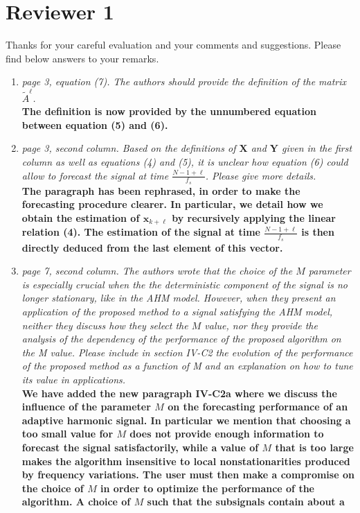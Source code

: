 \documentclass[11pt,DIV=16]{scrartcl}
\begin{document}
\section*{Reviewer 1}
Thanks for your careful evaluation and your comments and suggestions. Please find below answers to your remarks.
\begin{enumerate}[1)]
\item
\textit{page 3, equation (7). The authors should provide the definition of the matrix $\tilde{A}^\ell$.}\\
\textbf{The definition is now provided by the unnumbered equation between equation (5) and (6).}
\item
\textit{page 3, second column. Based on the definitions of $\mathbf{X}$ and $\mathbf{Y}$ given in the first column as well as equations (4) and (5), it is unclear how equation (6) could allow to forecast the signal at time $\frac{N-1+\ell}{f_s}$. Please give more details.}\\
\textbf{The paragraph has been rephrased, in order to make the forecasting procedure clearer. In particular, we detail how we obtain the estimation of $\mathbf{x}_{k+\ell}$ by recursively applying the linear relation (4). The estimation of the signal at time $\frac{N-1+\ell}{f_s}$ is then directly deduced from the last element of this vector.}
\item
\textit{page 7, second column. The authors wrote that the choice of the $M$ parameter is especially crucial when the the deterministic component of the signal is no longer stationary, like in the AHM model.
However, when they present an application of the proposed method to a signal satisfying the AHM model, neither they discuss how they select the $M$ value, nor they provide the analysis of the dependency of the performance of the proposed algorithm on the M value. Please include in section IV-C2 the evolution of the performance of the proposed method as a function of M and an explanation on how to tune its value in applications.}\\
\textbf{We have added the new paragraph IV-C2a where we discuss the influence of the parameter $M$ on the forecasting performance of an adaptive harmonic signal. In particular we mention that choosing a too small value for $M$ does not provide enough information to forecast the signal satisfactorily, while a value of $M$ that is too large makes the algorithm insensitive to local nonstationarities produced by frequency variations. The user must then make a compromise on the choice of $M$ in order to optimize the performance of the algorithm. A choice of $M$ such that the subsignals contain about a
}
\end{enumerate}
\end{document}
